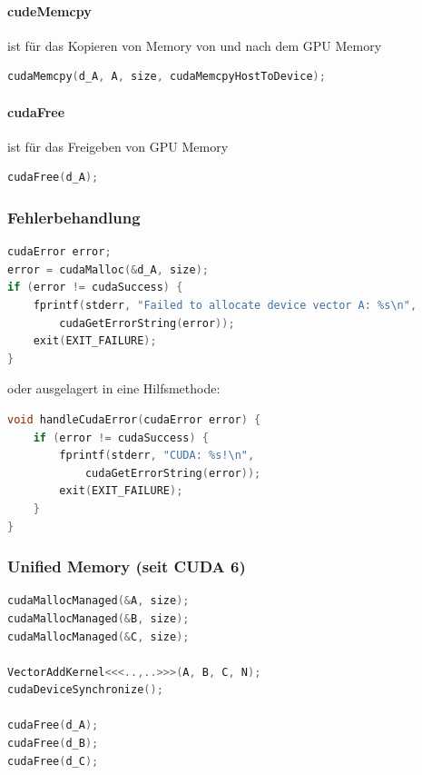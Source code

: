 \paragraph{cudeMemcpy} ist für das Kopieren von Memory von und nach dem GPU Memory

\begin{lstlisting}[language=C++]
cudaMemcpy(d_A, A, size, cudaMemcpyHostToDevice);
\end{lstlisting}


\paragraph{cudaFree} ist für das Freigeben von GPU Memory

\begin{lstlisting}[language=C++]
cudaFree(d_A);
\end{lstlisting}


\subsubsection{Fehlerbehandlung}

\begin{lstlisting}[language=C++]
cudaError error;
error = cudaMalloc(&d_A, size);
if (error != cudaSuccess) {
	fprintf(stderr, "Failed to allocate device vector A: %s\n",
		cudaGetErrorString(error));
	exit(EXIT_FAILURE);
}
\end{lstlisting}

oder ausgelagert in eine Hilfsmethode:

\begin{lstlisting}[language=C++]
void handleCudaError(cudaError error) {
	if (error != cudaSuccess) {
		fprintf(stderr, "CUDA: %s!\n",
			cudaGetErrorString(error));
		exit(EXIT_FAILURE);
	}
}
\end{lstlisting}

\subsubsection{Unified Memory (seit CUDA 6)}

\begin{lstlisting}[language=C++]
cudaMallocManaged(&A, size);
cudaMallocManaged(&B, size);
cudaMallocManaged(&C, size);

VectorAddKernel<<<..,..>>>(A, B, C, N);
cudaDeviceSynchronize();

cudaFree(d_A);
cudaFree(d_B);
cudaFree(d_C);
\end{lstlisting}



